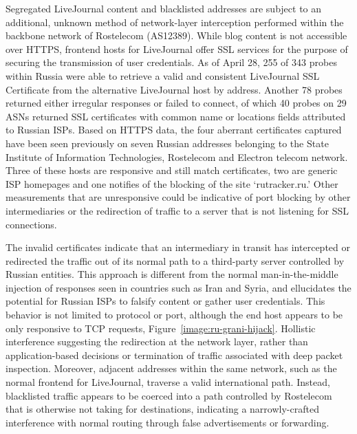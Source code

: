 Segregated LiveJournal content and blacklisted addresses are subject to an
additional, unknown method of network-layer interception performed within the
backbone network of Rostelecom (AS12389). While blog content is not
accessible over HTTPS, frontend hosts for LiveJournal offer SSL services for the purpose of
securing the transmission of user credentials. As of April 28, 255 of 343
probes within Russia were able to retrieve a valid and consistent LiveJournal
SSL Certificate from the alternative LiveJournal host by address. Another 78
probes returned either irregular responses or failed to connect, of which 40
probes on 29 ASNs returned SSL certificates with common name or locations
fields attributed to Russian ISPs. Based on HTTPS data, the four aberrant
certificates captured have been seen previously on seven Russian addresses
belonging to the State Institute of Information Technologies, Rostelecom and
Electron telecom network. Three of these hosts are responsive and still match
certificates, two are generic ISP homepages and one notifies of the blocking of
the site `rutracker.ru.' Other measurements that are unresponsive could be
indicative of port blocking by other intermediaries or the redirection of
traffic to a server that is not listening for SSL connections.

The invalid certificates indicate that an intermediary in transit has
intercepted or redirected the traffic out of its normal path to a third-party
server controlled by Russian entities. This approach is different from the
normal man-in-the-middle injection of responses seen in countries such as Iran and Syria, and
ellucidates the potential for Russian ISPs to falsify content or gather user
credentials. This behavior is not limited to protocol or port, although the end
host appears to be only responsive to TCP requests, Figure~\ref{image:ru-grani-hijack}. Hollistic interference suggesting the redirection
at the network layer, rather than application-based decisions or termination of
traffic associated with deep packet inspection. Moreover, adjacent addresses
within the same network, such as the normal frontend
for LiveJournal, traverse a valid international path. Instead, blacklisted
	traffic appears to be coerced into a path controlled by Rostelecom that is
	otherwise not taking for destinations, indicating a
	narrowly-crafted interference with normal routing through false
	advertisements or forwarding.
